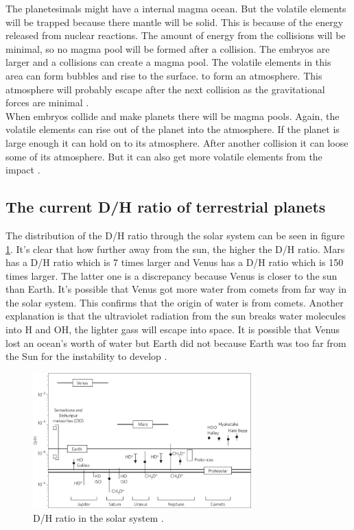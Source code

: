 The planetesimals might have a internal magma ocean. But the volatile elements will be trapped because there mantle will be solid. This is because of the energy released from nuclear reactions. The amount of energy from the collisions will be minimal, so no magma pool will be formed after a collision. The embryos are larger and a collisions can create a magma pool. The volatile elements in this area can form bubbles and rise to the surface. to form an atmosphere. This atmosphere will probably escape after the next collision as the gravitational forces are minimal \cite[p.~118-123]{TPmagma}.\\

When embryos collide and make planets there will be magma pools. Again, the volatile elements can rise out of the planet into the atmosphere. If the planet is large enough it can hold on to its atmosphere. After another collision it can loose some of its atmosphere. But it can also get more volatile elements from the impact \cite[p.~118-123]{TPmagma}. 







\newpage
\subsection{The current D/H ratio of terrestrial planets}
The distribution of the D/H ratio through the solar system can be seen in figure \ref{fig:dh-ratio-terrestrial-planets}. It's clear that how further away from the sun, the higher the D/H ratio. Mars has a D/H ratio which is 7 times larger and Venus has a D/H ratio which is 150 times larger. The latter one is a discrepancy because Venus is closer to the sun than Earth. It's possible that Venus got more water from comets from far way in the solar system. This confirms that the origin of water is from comets. Another explanation is that the ultraviolet radiation from the sun breaks water molecules into H and OH, the lighter gass will escape into space. It is possible that Venus lost an ocean’s worth of water but Earth did not because Earth was too far from the Sun for the instability to develop \cite{TPthreeEras}.

\begin{figure}[H]
	\center
	\includegraphics[width=0.75\textwidth]{figures/dh-ratio-terrestrial-planets.jpg}
	\caption{\label{fig:dh-ratio-terrestrial-planets}D/H ratio in the solar system \cite{TPthreeEras}.}
\end{figure}
